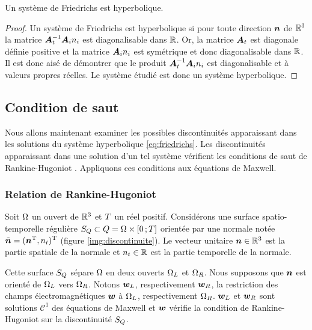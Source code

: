 \begin{proposition}
	Un système de Friedrichs est hyperbolique.
\end{proposition}

\begin{proof}
	Un système de Friedrichs est hyperbolique si pour toute direction $\bm{n}$ de $\mathbb{R}^{3}$
la matrice $\bm{A}_{t}^{-1}{\bm{A}_{i}n_{i}}$ est diagonalisable dans $\mathbb{R}$.
Or, la matrice $\bm{A}_{t}$ est diagonale définie positive et la matrice ${\bm{A}_{i}n_{i}}$ est
symétrique et donc diagonalisable dans $\mathbb{R}$.
Il est donc aisé de démontrer que le produit
$\bm{A}_{t}^{-1}{\bm{A}_{i}n_{i}}$ est diagonalisable et à valeurs propres réelles.
Le système étudié est donc un système hyperbolique.
\end{proof}


\subsection{Condition de saut}
\label{ssect:systeme_de_friedrichs_saut}


Nous allons maintenant examiner les possibles discontinuités apparaissant
dans les solutions du système hyperbolique \eqref{eq:friedrichs}. Les discontinuités
apparaissant dans une solution d’un tel système vérifient les conditions
de saut de Rankine-Hugoniot \cite{sauts}.
Appliquons ces conditions aux équations de Maxwell.



\subsubsection{Relation de Rankine-Hugoniot}
\label{sssect:rankine-hugoniot}

Soit $\Omega$ un ouvert de $\mathbb{R}^{3}$ et $T$ un réel positif.
Considérons une surface spatio-temporelle régulière
$S_Q \subset Q = \Omega \times \lbrack0\,;T\rbrack$
orientée par une normale notée
$\tilde{\bm{n}} = (\bm{n}^{\mathrm{T}},n_{t})^{\mathrm{T}}$ (figure \ref{img:discontinuite}).
Le vecteur unitaire $\bm{n} \in \mathbb{R}^{3}$ est la partie spatiale de la normale et
$n_{t} \in \mathbb{R}$ est la partie temporelle de la normale.

Cette surface $S_Q$ sépare $\Omega$ en deux ouverts $\Omega_L$ et
$\Omega_R$. Nous supposons que $\bm{n}$ est orienté de $\Omega_L$ vers
$\Omega_R$. Notons $\bm{w}_L$, respectivement $\bm{w}_R$, la
restriction des champs électromagnétiques $\bm{w}$ à $\Omega_L$, respectivement
$\Omega_R$. $\bm{w}_L$ et $\bm{w}_R$ sont solutions $\mathcal{C}^1$ des
équations de Maxwell et $\bm{w}$ vérifie la condition de Rankine-Hugoniot sur la
discontinuité $S_Q$.


